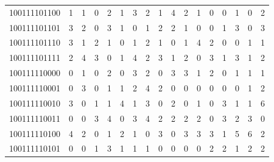 \documentclass[10pt,a4paper]{article}
\begin{document}
\begin{longtable}{ |c|c|c|c|c|c|c|c|c|c|c|c|c|c|c|c|c| }
    100111101100              & 1                            & 1                                & 0                            & 2                              & 1   & 3   & 2   & 1   & 4   & 2   & 1   & 0   & 0   & 1   & 0   & 2   \\
    100111101101              & 3                            & 2                                & 0                            & 3                              & 1   & 0   & 1   & 2   & 2   & 1   & 0   & 0   & 1   & 3   & 0   & 3   \\
    100111101110              & 3                            & 1                                & 2                            & 1                              & 0   & 1   & 2   & 1   & 0   & 1   & 4   & 2   & 0   & 0   & 1   & 1   \\
    100111101111              & 2                            & 4                                & 3                            & 0                              & 1   & 4   & 2   & 3   & 1   & 2   & 0   & 3   & 1   & 3   & 1   & 2   \\
    100111110000              & 0                            & 1                                & 0                            & 2                              & 0   & 3   & 2   & 0   & 3   & 3   & 1   & 2   & 0   & 1   & 1   & 1   \\
    100111110001              & 0                            & 3                                & 0                            & 1                              & 1   & 2   & 4   & 2   & 0   & 0   & 0   & 0   & 0   & 0   & 1   & 2   \\
    100111110010              & 3                            & 0                                & 1                            & 1                              & 4   & 1   & 3   & 0   & 2   & 0   & 1   & 0   & 3   & 1   & 1   & 6   \\
    100111110011              & 0                            & 0                                & 3                            & 4                              & 0   & 3   & 4   & 2   & 2   & 2   & 2   & 0   & 3   & 2   & 3   & 0   \\
    100111110100              & 4                            & 2                                & 0                            & 1                              & 2   & 1   & 0   & 3   & 0   & 3   & 3   & 3   & 1   & 5   & 6   & 2   \\
    100111110101              & 0                            & 0                                & 1                            & 3                              & 1   & 1   & 1   & 0   & 0   & 0   & 0   & 2   & 2   & 1   & 2   & 2   \\

\end{longtable}
\end{document}
